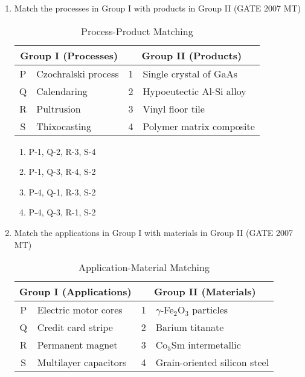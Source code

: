 \documentclass[12pt]{article}
\begin{document}
\begin{enumerate}

\item Match the processes in Group I with products in Group II (GATE 2007 MT)\\[1ex]
\begin{table}[h!]
\centering
\caption{Process-Product Matching}
\label{tab:q44_matching}
\begin{tabular}{|c|l||c|l|}
\hline
\multicolumn{2}{|c||}{\textbf{Group I (Processes)}} & \multicolumn{2}{c|}{\textbf{Group II (Products)}} \\
\hline
P & Czochralski process & 1 & Single crystal of GaAs \\
Q & Calendaring         & 2 & Hypoeutectic Al-Si alloy \\
R & Pultrusion          & 3 & Vinyl floor tile \\
S & Thixocasting        & 4 & Polymer matrix composite \\
\hline
\end{tabular}
\end{table}

  \begin{enumerate}[label=(\Alph*)]
    \item P-1, Q-2, R-3, S-4
    \item P-1, Q-3, R-4, S-2
    \item P-4, Q-1, R-3, S-2
    \item P-4, Q-3, R-1, S-2
  \end{enumerate}


\item Match the applications in Group I with materials in Group II (GATE 2007 MT)\\[1ex]
\begin{table}[h!]
\centering
\caption{Application-Material Matching}
\label{tab:q45_matching}
\begin{tabular}{|c|l||c|l|}
\hline
\multicolumn{2}{|c||}{\textbf{Group I (Applications)}} & \multicolumn{2}{c|}{\textbf{Group II (Materials)}} \\
\hline
P & Electric motor cores     & 1 & $\gamma$-Fe$_2$O$_3$ particles \\
Q & Credit card stripe       & 2 & Barium titanate \\
R & Permanent magnet         & 3 & Co$_5$Sm intermetallic \\
S & Multilayer capacitors    & 4 & Grain-oriented silicon steel \\
\hline
\end{tabular}
\end{table}


\end{enumerate}
\end{document}
